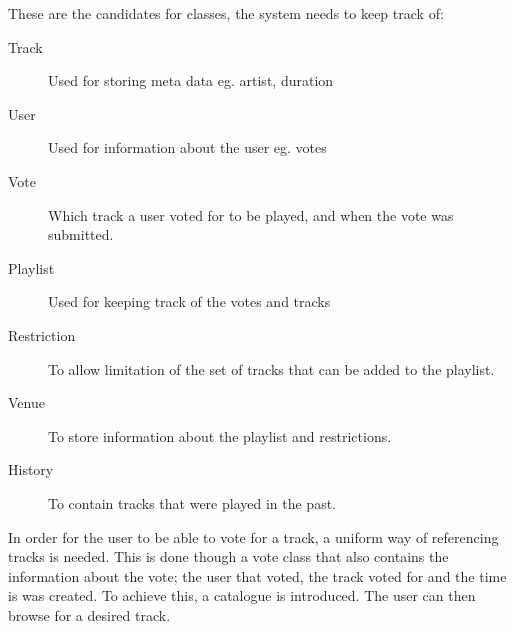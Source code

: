 These are the candidates for classes, the system needs to keep track of:
\begin{description}
    \item[Track]

    Used for storing meta data eg. artist, duration
    \item[User]

    Used for information about the user eg. votes
    \item[Vote]

    Which track a user voted for to be played, and when the vote was submitted.
    \item[Playlist]

    Used for keeping track of the votes and tracks
    \item[Restriction]

    To allow limitation of the set of tracks that can be added to the playlist.
    \item[Venue]

    To store information about the playlist and restrictions.
    \item[History]
    To contain tracks that were played in the past.
\end{description}

In order for the user to be able to vote for a track, a uniform way of referencing tracks is needed. This is done though a vote class that also contains the information about the vote; the user that voted, the track voted for and the time is was created. To achieve this, a catalogue is introduced. The user can then browse for a desired track.
